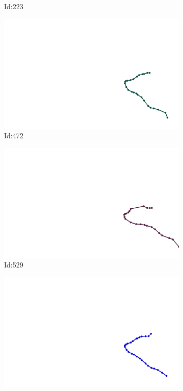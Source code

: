 \documentclass[12pt,twoside]{report}
\begin{document}
\begin{figure}
\begin{subfigure}[b]{0.20\textwidth}
\caption{Id:223}
\end{subfigure}
\begin{subfigure}[b]{0.20\textwidth}
\centering
\includegraphics[width=\textwidth]{../../trajectories/472.png}
\caption{Id:472}
\end{subfigure}
\begin{subfigure}[b]{0.20\textwidth}
\centering
\includegraphics[width=\textwidth]{../../trajectories/529.png}
\caption{Id:529}
\end{subfigure}
\begin{subfigure}[b]{0.20\textwidth}
\centering
\includegraphics[width=\textwidth]{../../trajectories/581.png}

\end{subfigure}
\end{figure}
\end{document}
